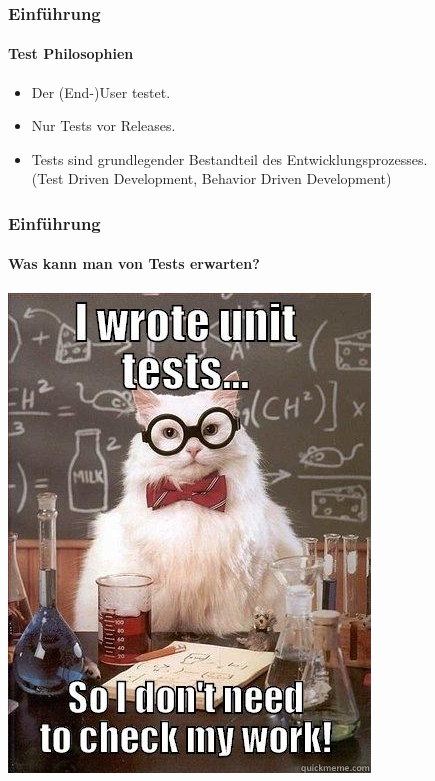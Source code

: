 \begin{frame}
  \frametitle{Einführung}
  \framesubtitle{Test Philosophien}
  \begin{itemize}
    \item Der (End-)User testet.
      \pause
    \item Nur Tests vor Releases.
      \pause
    \item Tests sind grundlegender Bestandteil des Entwicklungsprozesses.\\
      (Test Driven Development, Behavior Driven Development)
  \end{itemize}
\end{frame}

\begin{frame}
  \frametitle{Einführung}
  \framesubtitle{Was kann man von Tests erwarten?}
  \begin{center}
    \includegraphics[scale=0.4]{unittestingCat.jpg}
  \end{center}
\end{frame}

